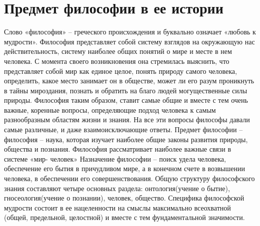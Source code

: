 \documentclass[12pt]{article}
\begin{document}
\tableofcontents


\newpage
\section{Предмет философии в ее истории}
Слово  «философия»  –  греческого  происхождения  и  буквально  означает  «любовь  к  мудрости».  Философия
представляет собой систему взглядов на окружающую нас действительность, систему наиболее общих понятий
о мире и месте в нем человека. С момента своего возникновения она стремилась выяснить, что представляет
собой мир как единое целое, понять природу самого человека, определить, какое место занимает он в обществе,
может ли его разум проникнуть в тайны мироздания, познать и обратить на благо людей могущественные силы
природы. Философия таким образом, ставит самые общие и вместе с тем очень важные, коренные вопросы,
определяющие  подход  человека  к  самым  разнообразным  областям  жизни  и  знания.  На  все  эти  вопросы
философы давали самые различные, и даже взаимоисключающие ответы.
Предмет философии – философия – наука, которая изучает наиболее общие законы развития природы, общества
и познания. Философия рассматривает наиболее важные связи в системе «мир- человек»
Назначение философии – поиск удела человека, обеспечение его бытия в причудливом мире, а в конечном счете
в  возвышении  человека,  в  обеспечении  его  совершенствования.  Общую  структуру  философского  знания
составляют четыре основных раздела: онтология(учение о бытие), гносеология(учение о познании), человек,
общество.
Специфика философской мудрости состоит в ее нацеленности на смыслы максимально всеохватной (общей,
предельной, целостной) и вместе с тем фундаментальной значимости.


\newpage
\end{document}
